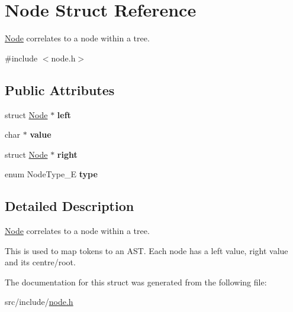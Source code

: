 \hypertarget{struct_node}{}\section{Node Struct Reference}
\label{struct_node}


\mbox{\hyperlink{struct_node}{Node}} correlates to a node within a tree.  




{\ttfamily \#include $<$node.\+h$>$}

\subsection*{Public Attributes}
\begin{DoxyCompactItemize}
\item 
\mbox{\label{struct_node_ad0976834843c7618677d22a10c495b36}} 
struct \mbox{\hyperlink{struct_node}{Node}} $\ast$ {\bfseries left}
\item 
\mbox{\label{struct_node_a785f15caf45b9b7aa4984bc72bf4a525}} 
char $\ast$ {\bfseries value}
\item 
\mbox{\label{struct_node_af99e7102380da88d7c079fa264230cf4}} 
struct \mbox{\hyperlink{struct_node}{Node}} $\ast$ {\bfseries right}
\item 
\mbox{\label{struct_node_ad788fa9cee205bcf2603f0fc29075f18}} 
enum Node\+Type\+\_\+E {\bfseries type}
\end{DoxyCompactItemize}


\subsection{Detailed Description}
\mbox{\hyperlink{struct_node}{Node}} correlates to a node within a tree. 

This is used to map tokens to an A\+ST. Each node has a left value, right value and its centre/root. 

The documentation for this struct was generated from the following file\+:\begin{DoxyCompactItemize}
\item 
src/include/\mbox{\hyperlink{node_8h}{node.\+h}}\end{DoxyCompactItemize}
